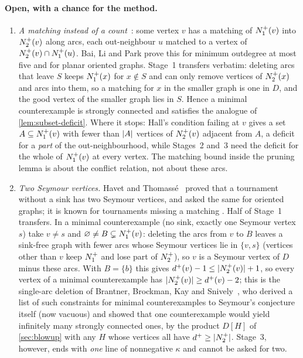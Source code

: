 \paragraph{Open, with a chance for the method.}
\begin{enumerate}[label=(\alph*),leftmargin=2em,start=7]
\item \emph{A matching instead of a count}~\cite{BaiLiPark2026}: some vertex $v$ has a
matching of $N^+_1(v)$ into $N^+_2(v)$ along arcs, each out-neighbour $u$ matched to a
vertex of $N^+_2(v)\cap N^+_1(u)$. Bai, Li and Park prove this for minimum outdegree at
most five and for planar oriented graphs. Stage~1 transfers verbatim: deleting arcs
that leave $S$ keeps $N^+_1(x)$ for $x\notin S$ and can only remove vertices of
$N^+_2(x)$ and arcs into them, so a matching for $x$ in the smaller graph is one in
$D$, and the good vertex of the smaller graph lies in $S$. Hence a minimal
counterexample is strongly connected and satisfies the analogue of
\cref{lem:subset-deficit}. Where it stops: Hall's condition failing at $v$ gives a set
$A\subseteq N^+_1(v)$ with fewer than $\lvert A\rvert$ vertices of $N^+_2(v)$ adjacent from $A$,
a deficit for a \emph{part} of the out-neighbourhood, while Stages~2 and~3 need the
deficit for the whole of $N^+_1(v)$ at every vertex. The matching bound inside the
pruning lemma is about the conflict relation, not about these arcs.
\item \emph{Two Seymour vertices.} Havet and Thomass\'e~\cite{HavetThomasse2000} proved
that a tournament without a sink has two Seymour vertices, and asked the same for
oriented graphs; it is known for tournaments missing a matching
\cite{DaraFrancisJacobNarayanan2022,Ghazal2015}. Half of Stage~1 transfers. In a
minimal counterexample (no sink, exactly one Seymour vertex $s$) take $v\ne s$ and
$\varnothing\ne B\subsetneq N^+_1(v)$: deleting the arcs from $v$ to $B$ leaves a
sink-free graph with fewer arcs whose Seymour vertices lie in $\{v,s\}$ (vertices other
than $v$ keep $N^+_1$ and lose part of $N^+_2$), so $v$ is a Seymour vertex of $D$
minus these arcs. With $B=\{b\}$ this gives $d^+(v)-1\le\lvert N^+_2(v)\rvert+1$, so every
vertex of a minimal counterexample has $\lvert N^+_2(v)\rvert\ge d^+(v)-2$; this is the
single-arc deletion of Brantner, Brockman, Kay and
Snively~\cite[Theorem~4.1]{BrantnerBrockmanKaySnively2009}, who derived a list of
such constraints for minimal counterexamples to Seymour's conjecture itself (now
vacuous) and showed that one counterexample would yield infinitely many strongly
connected ones, by the product $D[H]$ of \cref{sec:blowup} with any $H$ whose
vertices all have $d^+\ge\lvert N^+_2\rvert$. Stage~3, however,
ends with \emph{one} line of nonnegative $\kappa$ and cannot be asked for two.
\end{enumerate}

